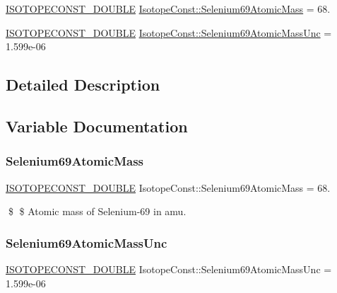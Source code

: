 \begin{DoxyCompactItemize}
\item 
\mbox{\hyperlink{group___isotope_const-_macros_ga8f45a7272ce02c0b4c65c44636ed719a}{I\+S\+O\+T\+O\+P\+E\+C\+O\+N\+S\+T\+\_\+\+D\+O\+U\+B\+LE}} \mbox{\hyperlink{group___isotope_const-_selenium-_se69_gae250cf26f2b18302f47cd9e5ecd7092c}{Isotope\+Const\+::\+Selenium69\+Atomic\+Mass}} = 68.
\item 
\mbox{\hyperlink{group___isotope_const-_macros_ga8f45a7272ce02c0b4c65c44636ed719a}{I\+S\+O\+T\+O\+P\+E\+C\+O\+N\+S\+T\+\_\+\+D\+O\+U\+B\+LE}} \mbox{\hyperlink{group___isotope_const-_selenium-_se69_ga207e9bcb06def3f4cb604022e09f213e}{Isotope\+Const\+::\+Selenium69\+Atomic\+Mass\+Unc}} = 1.\+599e-\/06
\end{DoxyCompactItemize}


\subsection{Detailed Description}


\subsection{Variable Documentation}
\mbox{\label{group___isotope_const-_selenium-_se69_gae250cf26f2b18302f47cd9e5ecd7092c}} 
\subsubsection{\texorpdfstring{Selenium69\+Atomic\+Mass}{Selenium69AtomicMass}}
{\footnotesize\ttfamily \mbox{\hyperlink{group___isotope_const-_macros_ga8f45a7272ce02c0b4c65c44636ed719a}{I\+S\+O\+T\+O\+P\+E\+C\+O\+N\+S\+T\+\_\+\+D\+O\+U\+B\+LE}} Isotope\+Const\+::\+Selenium69\+Atomic\+Mass = 68.}

\$ \$ Atomic mass of Selenium-\/69 in amu. \mbox{\label{group___isotope_const-_selenium-_se69_ga207e9bcb06def3f4cb604022e09f213e}} 
\subsubsection{\texorpdfstring{Selenium69\+Atomic\+Mass\+Unc}{Selenium69AtomicMassUnc}}
{\footnotesize\ttfamily \mbox{\hyperlink{group___isotope_const-_macros_ga8f45a7272ce02c0b4c65c44636ed719a}{I\+S\+O\+T\+O\+P\+E\+C\+O\+N\+S\+T\+\_\+\+D\+O\+U\+B\+LE}} Isotope\+Const\+::\+Selenium69\+Atomic\+Mass\+Unc = 1.\+599e-\/06}

